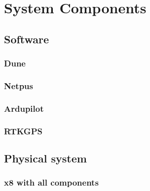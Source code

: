 
\chapter{System Components}
\section{Software}
\subsection{Dune}
\subsection{Netpus}
\subsection{Ardupilot}
\subsection{RTKGPS}
\section{Physical system}
\subsection{x8 with all components}


\cleardoublepage